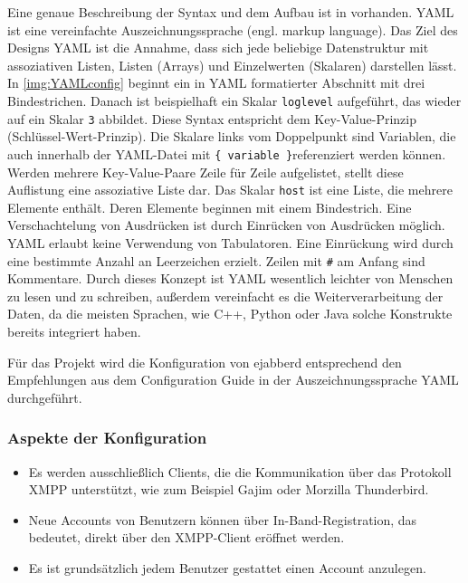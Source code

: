 \documentclass[a4paper,titlepage,halfparskip,12pt]{scrreprt}
\begin{document}
\begin{onehalfspacing}
Eine genaue Beschreibung der Syntax und dem Aufbau ist in \cite{specificationYAML} vorhanden. \ac{YAML} ist eine vereinfachte Auszeichnungssprache (engl. markup language). Das Ziel des Designs \ac{YAML} ist die Annahme, dass sich jede beliebige Datenstruktur mit assoziativen Listen, Listen (Arrays) und Einzelwerten (Skalaren) darstellen lässt. In \autoref{img:YAMLconfig} beginnt ein in \ac{YAML} formatierter Abschnitt mit drei Bindestrichen. Danach ist beispielhaft ein Skalar \texttt{loglevel} aufgeführt, das wieder auf ein Skalar \texttt{3} abbildet. Diese Syntax entspricht dem Key-Value-Prinzip (Schlüssel-Wert-Prinzip). Die Skalare links vom Doppelpunkt sind Variablen, die auch innerhalb der \ac{YAML}-Datei mit \glqq \texttt{\{ variable \}}\grqq referenziert werden können. Werden mehrere Key-Value-Paare Zeile für Zeile aufgelistet, stellt diese Auflistung eine assoziative Liste dar. Das Skalar \texttt{host} ist eine Liste, die mehrere Elemente enthält. Deren Elemente beginnen mit einem Bindestrich. Eine Verschachtelung von Ausdrücken ist durch Einrücken von Ausdrücken möglich. \ac{YAML} erlaubt keine Verwendung von Tabulatoren. Eine Einrückung wird durch eine bestimmte Anzahl an Leerzeichen erzielt. Zeilen mit \texttt{\#} am Anfang sind Kommentare. Durch dieses Konzept ist \ac{YAML} wesentlich leichter von Menschen zu lesen und zu schreiben, außerdem vereinfacht es die Weiterverarbeitung der Daten, da die meisten Sprachen, wie C++, Python oder Java solche Konstrukte bereits integriert haben.

Für das Projekt wird die Konfiguration von ejabberd entsprechend den Empfehlungen aus dem Configuration Guide \cite{ejabberdDoc} in der Auszeichnungssprache \ac{YAML} durchgeführt.

\subsubsection*{Aspekte der Konfiguration}

\begin{itemize}
\item Es werden ausschließlich Clients, die die Kommunikation über das Protokoll \ac{XMPP} unterstützt, wie zum Beispiel Gajim oder Morzilla Thunderbird.

\item Neue Accounts von Benutzern können über In-Band-Registration, das bedeutet, direkt über den \ac{XMPP}-Client eröffnet werden.

\item Es ist grundsätzlich jedem Benutzer gestattet einen Account anzulegen.


\end{itemize}
\end{onehalfspacing}
\end{document}
